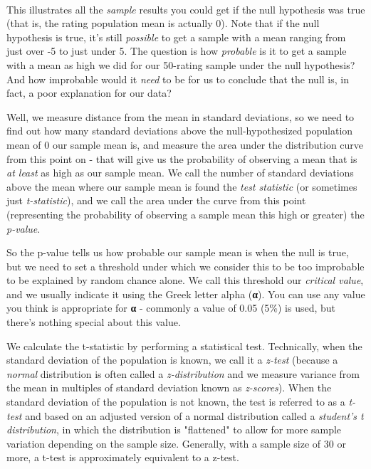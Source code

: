 \documentclass[11pt]{article}
\begin{document}
    \begin{center}
    \end{center}
    { \hspace*{\fill} \\}
    
    This illustrates all the \emph{sample} results you could get if the null
hypothesis was true (that is, the rating population mean is actually 0).
Note that if the null hypothesis is true, it's still \emph{possible} to
get a sample with a mean ranging from just over -5 to just under 5. The
question is how \emph{probable} is it to get a sample with a mean as
high we did for our 50-rating sample under the null hypothesis? And how
improbable would it \emph{need} to be for us to conclude that the null
is, in fact, a poor explanation for our data?

Well, we measure distance from the mean in standard deviations, so we
need to find out how many standard deviations above the
null-hypothesized population mean of 0 our sample mean is, and measure
the area under the distribution curve from this point on - that will
give us the probability of observing a mean that is \emph{at least} as
high as our sample mean. We call the number of standard deviations above
the mean where our sample mean is found the \emph{test statistic} (or
sometimes just \emph{t-statistic}), and we call the area under the curve
from this point (representing the probability of observing a sample mean
this high or greater) the \emph{p-value}.

So the p-value tells us how probable our sample mean is when the null is
true, but we need to set a threshold under which we consider this to be
too improbable to be explained by random chance alone. We call this
threshold our \emph{critical value}, and we usually indicate it using
the Greek letter alpha (\textbf{α}). You can use any value you think is
appropriate for \textbf{α} - commonly a value of 0.05 (5\%) is used, but
there's nothing special about this value.

We calculate the t-statistic by performing a statistical test.
Technically, when the standard deviation of the population is known, we
call it a \emph{z-test} (because a \emph{normal} distribution is often
called a \emph{z-distribution} and we measure variance from the mean in
multiples of standard deviation known as \emph{z-scores}). When the
standard deviation of the population is not known, the test is referred
to as a \emph{t-test} and based on an adjusted version of a normal
distribution called a \emph{student's t distribution}, in which the
distribution is "flattened" to allow for more sample variation depending
on the sample size. Generally, with a sample size of 30 or more, a
t-test is approximately equivalent to a z-test.
\end{document}
